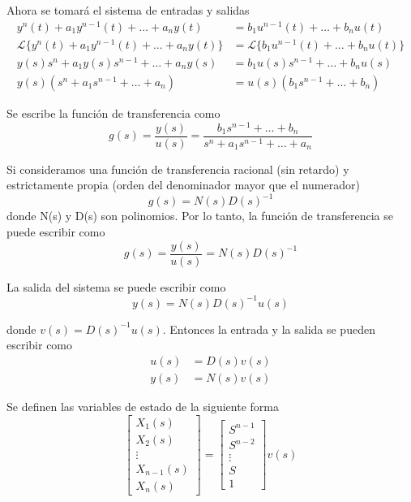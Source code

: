 Ahora se tomará el sistema de entradas y salidas
\[
    \begin{split}
        y^{n}(t) + a_{1}y^{n-1}(t) + \ldots + a_{n}y(t) & = b_{1}u^{n-1}(t) + \ldots + b_{n}u(t) \\
        \mathcal{L} \{ y^{n}(t) + a_{1}y^{n-1}(t) + \ldots + a_{n}y(t) \} & = \mathcal{L} \{ b_{1}u^{n-1}(t) + \ldots + b_{n}u(t) \}\\
        y(s)s^{n} + a_{1}y(s)s^{n-1} + \ldots + a_{n}y(s) & = b_{1}u(s)s^{n-1} + \ldots + b_{n}u(s)\\
        y(s) (s^{n} + a_{1}s^{n-1} +\ldots + a_{n} ) & = u(s) (b_{1}s^{n-1} + \ldots + b_{n})
    \end{split}
\]

Se escribe la función de transferencia como 
\[
    g(s) = \frac{y(s)}{u(s)} = \frac{ b_{1}s^{n-1} + \ldots + b_{n} }{ s^{n} + a_{1}s^{n-1} +\ldots + a_{n} }
\]

Si consideramos una función de transferencia racional (sin retardo) y estrictamente propia (orden del denominador mayor que el numerador)
\[
    g(s)=N(s)D(s)^{-1}
\]
donde N(s) y D(s) son polinomios. Por lo tanto, la función de transferencia se puede escribir como 
\[
    g(s) = \frac{y(s)}{u(s)} = N(s)D(s)^{-1}
\]

La salida del sistema se puede escribir como 
\[
    y(s) = N(s)D(s)^{-1}u(s)
\]

donde \( v(s) = D(s)^{-1}u(s) \). Entonces la entrada y la salida se pueden escribir como 
\[
    \begin{split}
        u(s) & = D(s)v(s) \\
        y(s) & = N(s)v(s)
    \end{split}
\]

Se definen las variables de estado de la siguiente forma
\[ 
    \begin{bmatrix}
        X_{1}(s) \\
        X_{2}(s) \\
        \vdots \\
        X_{n-1}(s) \\
        X_{n}(s)
    \end{bmatrix}
    =
    \begin{bmatrix}
        S^{n-1} \\
        S^{n-2}\\
        \vdots \\
        S \\
        1
    \end{bmatrix} v(s)
\]


